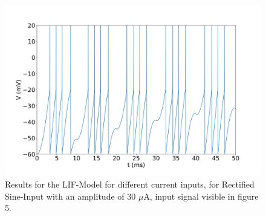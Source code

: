 \documentclass{scrartcl}			%
\begin{document}
\begin{figure}[h]					%
	\centering
	\includegraphics[scale=0.33]{3_4.png}
	\captionsetup{width=\linewidth}  %
	\caption{Results for the LIF-Model for different current inputs, for Rectified Sine-Input with an amplitude of 30 $\mu$A, input signal visible in figure 5.}
	\label{subsec_fig2_3} %
\end{figure}
\end{document}
